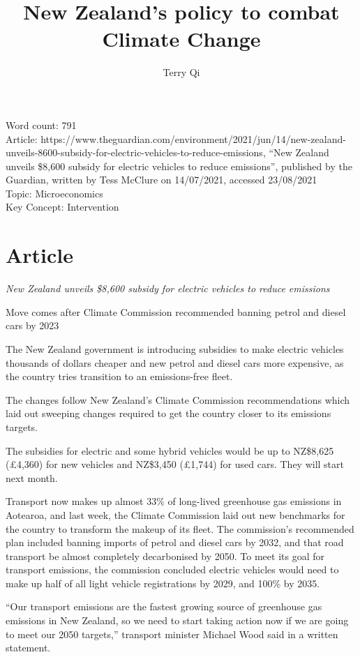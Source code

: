 \documentclass[a4paper,12pt]{article}
\title{New Zealand's policy to combat Climate Change}
\author{Terry Qi}
\newenvironment{itenv}
{\itshape}
    {}
\begin{document}
\maketitle

Word count: 791\\
Article: https://www.theguardian.com/environment/2021/jun/14/new-zealand-unveils-8600-subsidy-for-electric-vehicles-to-reduce-emissions, ``New Zealand unveils \$8,600 subsidy for electric vehicles to reduce emissions'', published by the Guardian, written by Tess McClure on 14/07/2021, accessed 23/08/2021\\
Topic: Microeconomics\\
Key Concept: Intervention

\newpage
\section*{Article}
\begin{itenv}
New Zealand unveils \$8,600 subsidy for electric vehicles to reduce emissions

Move comes after Climate Commission recommended banning petrol and diesel cars by 2023
\end{itenv}


The New Zealand government is introducing subsidies to make electric vehicles thousands of dollars cheaper and new petrol and diesel cars more expensive, as the country tries transition to an emissions-free fleet.

The changes follow New Zealand’s Climate Commission recommendations which laid out sweeping changes required to get the country closer to its emissions targets.

The subsidies for electric and some hybrid vehicles would be up to NZ\$8,625 (£4,360) for new vehicles and NZ\$3,450 (£1,744) for used cars. They will start next month.

Transport now makes up almost 33\% of long-lived greenhouse gas emissions in Aotearoa, and last week, the Climate Commission laid out new benchmarks for the country to transform the makeup of its fleet. The commission’s recommended plan included banning imports of petrol and diesel cars by 2032, and that road transport be almost completely decarbonised by 2050. To meet its goal for transport emissions, the commission concluded electric vehicles would need to make up half of all light vehicle registrations by 2029, and 100\% by 2035.

“Our transport emissions are the fastest growing source of greenhouse gas emissions in New Zealand, so we need to start taking action now if we are going to meet our 2050 targets,” transport minister Michael Wood said in a written statement.
\end{document}
